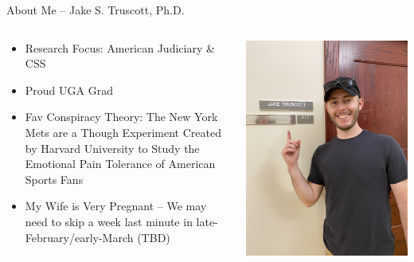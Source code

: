 \documentclass[
  ignorenonframetext,
]{beamer}
\begin{document}
\begin{frame}{About Me -- Jake S. Truscott, Ph.D.}
\label{about-me-jake-s.-truscott-ph.d.}
\begin{columns}[T] %
  \begin{column}{0.65\textwidth}
  \par \vspace{2.5mm}
  
  \begin{itemize}
  
  \item Research Focus: American Judiciary \& CSS  \par \vspace{2.5mm}
    \item Proud UGA Grad \par \vspace{1.5mm}
    \item Fav Conspiracy Theory: The New York Mets are a Though Experiment Created by Harvard University to Study the Emotional Pain Tolerance of American Sports Fans \par \vspace{1.5mm}
    \item My Wife is Very Pregnant -- We may need to skip a week last minute in late-February/early-March (TBD) \par \vspace{1.5mm}
  \end{itemize}
  \end{column}

  \begin{column}{0.5\textwidth}
    \centering
    \vspace{2.5mm}
    \includegraphics[width=0.75\linewidth]{../../images/me.jpg}
    \vfill

  \end{column}
\end{columns}
\end{frame}
\end{document}
